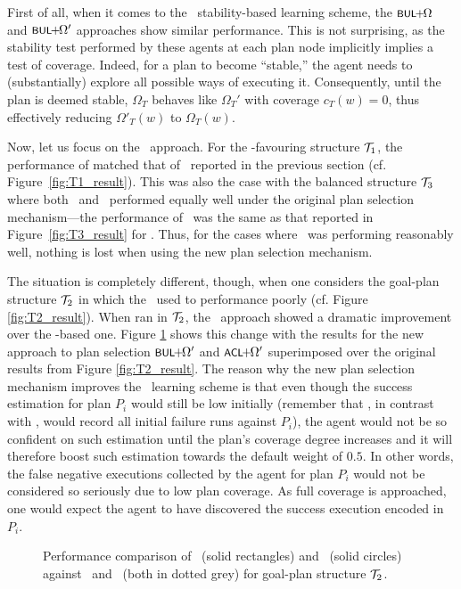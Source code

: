 First of all, when it comes to the \BUL\ stability-based learning scheme, the
 $\BULSELA$ and $\BULSELB$ approaches show similar performance.
This is not surprising, as the stability test performed by these agents at each
plan node implicitly implies a test of coverage. Indeed, for a plan to become
``stable,'' the agent needs to (substantially) explore all possible  ways of
executing it. Consequently,  until the plan is deemed stable, $\Omega_T$ behaves
like $\Omega_T'$ with coverage $c_T(w)=0$, thus effectively reducing
$\Omega'_T(w)$ to $\Omega_T(w)$.



Now, let us focus on the \CL\ approach.
For the \CL-favouring structure ${\mathcal{T}}_1$, the performance of \CLSELB matched that
of \CLSELA\ reported in the previous section (cf. Figure~\ref{fig:T1_result}).
This was also the case with the balanced structure ${\mathcal{T}}_3$ where both \CL\ and
\BUL\ performed equally well under the original plan selection mechanism---the
performance of \CLSELB\ was the same as that reported in
Figure~\ref{fig:T3_result} for \CLSELA.
Thus, for the cases where \CL\ was performing reasonably well, nothing is lost
when using the new plan selection mechanism.



The situation is completely different, though, when one considers the goal-plan
structure ${\mathcal{T}}_2$ in which the \CLSELA\ used to performance poorly (cf. Figure
\ref{fig:T2_result}).
When ran in ${\mathcal{T}}_2$, the \CLSELB\ approach showed a dramatic improvement over the
\CLSELA-based one. Figure \ref{fig:T2_result2} shows this change with the results
for the new approach to plan selection $\BULSELB$ and $\CLSELB$ superimposed over
the original results from Figure \ref{fig:T2_result}.
The reason why the new plan selection mechanism improves the \CL\ learning scheme
is that even though the success estimation for plan $P_i$ would still be low
initially (remember that \CL, in contrast with \BUL, would record all initial
failure runs against $P_i$), the agent would not be so confident on such
estimation until the plan's coverage degree increases and it will therefore boost
such estimation towards the default weight of $0.5$. In other words, the false
negative executions collected by the agent for plan $P_i$ would not be considered
so seriously due to low plan coverage. As full coverage is approached, one would
expect the agent to have discovered the success execution encoded in $P_i$.



\begin{figure}[t]
\begin{center}

\caption{Performance comparison of \CLSELB\ (solid rectangles) and \BULSELB\
(solid circles) against \CLSELA\ and \BULSELA\ (both in dotted grey) for
goal-plan structure ${\mathcal{T}}_2$.}
\label{fig:T2_result2}
\end{center}
\end{figure}



